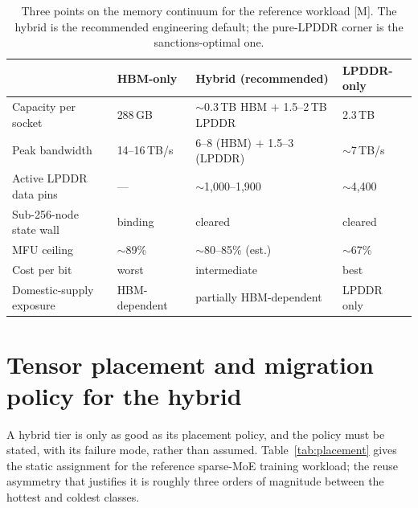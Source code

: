 \begin{table}[htbp]
  \centering
  \small
  \caption{Three points on the memory continuum for the reference workload [M]. The hybrid is the recommended engineering default; the pure-LPDDR corner is the sanctions-optimal one.}
  \label{tab:hybrid}
  \begin{tabular}{p{34mm}p{28mm}p{28mm}p{34mm}}
    \toprule
    & HBM-only & Hybrid (recommended) & LPDDR-only \\
    \midrule
    Capacity per socket & 288\,GB & $\sim$0.3\,TB HBM $+$ 1.5--2\,TB LPDDR & 2.3\,TB \\
    Peak bandwidth & 14--16\,TB/s & 6--8 (HBM) $+$ 1.5--3 (LPDDR) & $\sim$7\,TB/s \\
    Active LPDDR data pins & --- & $\sim$1,000--1,900 & $\sim$4,400 \\
    Sub-256-node state wall & binding & cleared & cleared \\
    MFU ceiling & $\sim$89\% & $\sim$80--85\% (est.) & $\sim$67\% \\
    Cost per bit & worst & intermediate & best \\
    Domestic-supply exposure & HBM-dependent & partially HBM-dependent & LPDDR only \\
    \bottomrule
  \end{tabular}
\end{table}

\section{Tensor placement and migration policy for the hybrid}
\label{sec:placement}

A hybrid tier is only as good as its placement policy, and the policy must be stated, with its failure mode, rather than assumed. Table~\ref{tab:placement} gives the static assignment for the reference sparse-MoE training workload; the reuse asymmetry that justifies it is roughly three orders of magnitude between the hottest and coldest classes.

